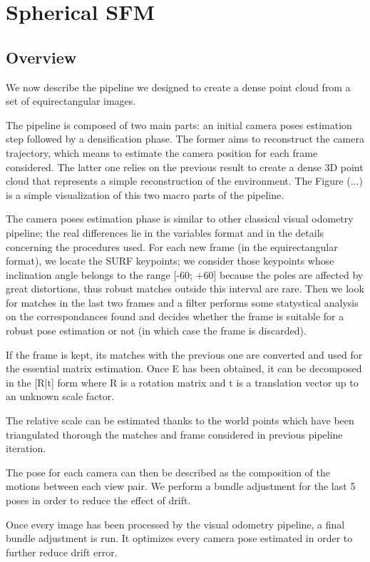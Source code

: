 \chapter{Spherical SFM}
\section{Overview}
We now describe the pipeline we designed to create a dense point cloud from 
a set of equirectangular images.

The pipeline is composed of two main parts: an initial camera poses estimation
step followed by a densification phase. The former aims to reconstruct the 
camera trajectory, which means to estimate the camera position for each frame 
considered. The latter one relies on the previous result to create a dense 
3D point cloud that represents a simple reconstruction of the environment.
The Figure (...) is a simple visualization of this two macro parts of the 
pipeline.

The camera poses estimation phase is similar to other classical visual 
odometry pipeline; the real differences lie in the variables format and in 
the details concerning the procedures used. For each new frame 
(in the equirectangular format), we locate the
SURF keypoints; we consider those keypoints whose inclination angle belongs 
to the range [-60; +60] because the poles are affected by great distortions, 
thus robust matches outside this interval are rare.
Then we look for matches in the last two frames and a filter performs some 
statystical analysis on the correspondances found and decides whether the frame 
is suitable for a robust pose estimation or not (in which case the frame is 
discarded).

If the frame is kept, its matches with the previous one are converted
and used for the essential matrix estimation. Once E has been obtained, 
it can be decomposed in the [R|t] form where R is a rotation matrix and t is a 
translation vector up to an unknown scale factor.

The relative scale can be estimated thanks to the world points which have been 
triangulated thorough the matches and frame considered in previous pipeline 
iteration.

The pose for each camera can then be described as the composition of the 
motions between each view pair. We perform a bundle adjustment for the last 5 
poses in order to reduce the effect of drift.

Once every image has been processed by the visual odometry pipeline, a final 
bundle adjustment is run. It optimizes every camera pose estimated in order to 
further reduce drift error.

